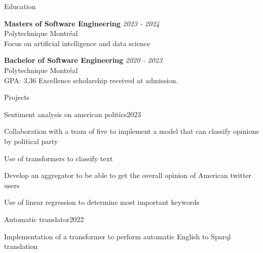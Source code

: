 \documentclass{resume} %
\begin{document}

\begin{rSection}{Education}

	{\bf Masters of Software Engineering} \hfill {\em 2023 - 2024}
	\\ Polytechnique Montréal
	\\ Focus on artificial intelligence and data science

		{\bf Bachelor of Software Engineering} \hfill {\em 2020 - 2023}
	\\ Polytechnique Montréal
	\\GPA: 3,36 \hspace{0.5cm}  Excellence scholarship received at admission.


\end{rSection}

\begin{rSection}{Projects}
	\begin{rSubsection}{Sentiment analysis on american politics}{2023}{}{}
		\item Collaboration with a team of five to implement a model that can classify opinions by political party
		\item Use of transformers to classify text
		\item Develop an aggregator to be able to get the overall opinion of American twitter users
		\item Use of linear regression to determine most important keywords
	\end{rSubsection}
	\begin{rSubsection}{Automatic translator}{2022}{}{}
		\item Implementation of a transformer to perform automatic English to Sparql translation
	\end{rSubsection}

\end{rSection}


\end{document}
